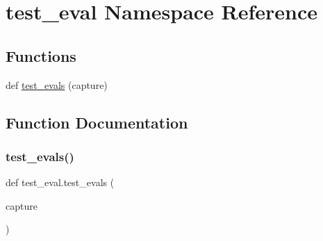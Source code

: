 \hypertarget{namespacetest__eval}{}\section{test\+\_\+eval Namespace Reference}
\label{namespacetest__eval}
\subsection*{Functions}
\begin{DoxyCompactItemize}
\item 
def \mbox{\hyperlink{namespacetest__eval_ab53d98c43062f2880f2a8c6539c6f8fa}{test\+\_\+evals}} (capture)
\end{DoxyCompactItemize}


\subsection{Function Documentation}
\mbox{\label{namespacetest__eval_ab53d98c43062f2880f2a8c6539c6f8fa}} 
\subsubsection{\texorpdfstring{test\_evals()}{test\_evals()}}
{\footnotesize\ttfamily def test\+\_\+eval.\+test\+\_\+evals (\begin{DoxyParamCaption}\item[{}]{capture }\end{DoxyParamCaption})}

